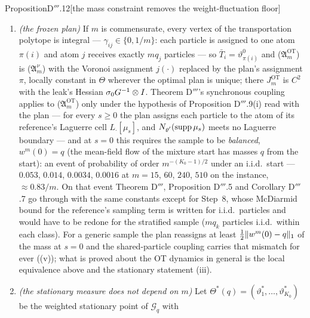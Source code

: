 \begin{thm}{Proposition}{D$'''$.12}[the mass constraint removes the weight-fluctuation floor]
\begin{enumerate}[label=\textup{(\roman*)}]
    $w_k(\Theta_s) := (1/m)\#\{i : j(\vartheta_i(s)) = k\}$ are conserved: $w^m(s) = w^m(0)$, the multinomial
    sample of the initial cloud, and the stationary floor of Proposition D$'''$.5 is the memory of the initial
    condition that this conservation law carries. Along \textup{($\mathfrak{A}_m^{\mathrm{OT}}$)} the masses
    assigned to the atoms are constrained instead: $\sum_i\gamma_{ij}(s) = q_j$ for every $s$.
  \item \emph{(the frozen plan)} If $m$ is commensurate, every vertex of the transportation polytope is integral
    --- $\gamma_{ij}\in\{0,1/m\}$: each particle is assigned to one atom $\pi(i)$ and atom $j$ receives exactly
    $mq_j$ particles --- so $\bar T_i = \vartheta^0_{\pi(i)}$ and \textup{($\mathfrak{A}_m^{\mathrm{OT}}$)} is
    \textup{($\mathfrak{A}_m^\nu$)} with the Voronoi assignment $j(\cdot)$ replaced by the plan's assignment $\pi$,
    locally constant in $\Theta$ wherever the optimal plan is unique; there $J_m^{\mathrm{OT}}$ is $C^2$ with the
    leak's Hessian $\sigma_0G^{-1}\otimes I$. Theorem D$'''$'s synchronous coupling applies to
    \textup{($\mathfrak{A}_m^{\mathrm{OT}}$)} only under the hypothesis of Proposition D$'''$.9(i) read with the
    plan --- for every $s\ge0$ the plan assigns each particle to the atom of its reference's Laguerre cell
    $L_\cdot[\mu_s]$, and $N_{\varrho'}(\operatorname{supp}\mu_s)$ meets no Laguerre boundary --- and at $s = 0$ this requires the
    sample to be \emph{balanced}, $w^m(0) = q$ (the mean-field flow of the mixture start has masses $q$ from the
    start): an event of probability of order $m^{-(K_0-1)/2}$ under an i.i.d.\ start --- $0.053$, $0.014$,
    $0.0034$, $0.0016$ at $m = 15$, $60$, $240$, $510$ on the instance, $\approx0.83/m$. On that event Theorem
    D$'''$, Proposition D$'''$.5 and Corollary D$'''$.7 go through with the same constants except for Step~8, whose
    McDiarmid bound for the reference's sampling term is written for i.i.d.\ particles and would have to be redone
    for the stratified sample ($mq_k$ particles i.i.d.\ within each class). For a generic sample the plan reassigns
    at least $\frac12\lVert w^m(0) - q\rVert_1$ of the mass at $s = 0$ and the shared-particle coupling carries that
    mismatch for ever ((v)); what is proved about the OT dynamics in general is the local equivalence above and the
    stationary statement (iii).
  \item \emph{(the stationary measure does not depend on $m$)} Let
    $\Theta^*(q) = (\vartheta^*_1,\dots,\vartheta^*_{K_0})$ be the weighted stationary point of $\mathcal{G}_q$ with

\end{enumerate}
\end{thm}
